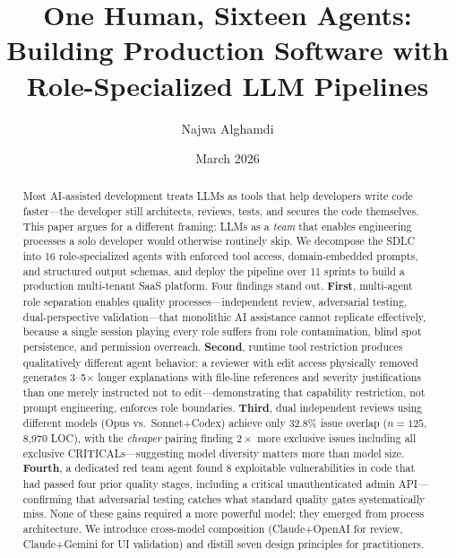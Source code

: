\documentclass[11pt,a4paper]{article}
\begin{document}
\title{One Human, Sixteen Agents:\\ Building Production Software with Role-Specialized LLM Pipelines}

\author[1]{Najwa Alghamdi}

\date{March 2026}

\maketitle

\begin{abstract}
Most AI-assisted development treats LLMs as tools that help developers write code faster---the developer still architects, reviews, tests, and secures the code themselves. This paper argues for a different framing: LLMs as a \textit{team} that enables engineering processes a solo developer would otherwise routinely skip. We decompose the SDLC into 16 role-specialized agents with enforced tool access, domain-embedded prompts, and structured output schemas, and deploy the pipeline over 11 sprints to build a production multi-tenant SaaS platform. Four findings stand out. \textbf{First}, multi-agent role separation enables quality processes---independent review, adversarial testing, dual-perspective validation---that monolithic AI assistance cannot replicate effectively, because a single session playing every role suffers from role contamination, blind spot persistence, and permission overreach. \textbf{Second}, runtime tool restriction produces qualitatively different agent behavior: a reviewer with edit access physically removed generates 3--5$\times$ longer explanations with file-line references and severity justifications than one merely instructed not to edit---demonstrating that capability restriction, not prompt engineering, enforces role boundaries. \textbf{Third}, dual independent reviews using different models (Opus vs.\ Sonnet+Codex) achieve only 32.8\% issue overlap ($n=125$, 8{,}970 LOC), with the \textit{cheaper} pairing finding $2\times$ more exclusive issues including all exclusive CRITICALs---suggesting model diversity matters more than model size. \textbf{Fourth}, a dedicated red team agent found 8 exploitable vulnerabilities in code that had passed four prior quality stages, including a critical unauthenticated admin API---confirming that adversarial testing catches what standard quality gates systematically miss. None of these gains required a more powerful model; they emerged from process architecture. We introduce cross-model composition (Claude+OpenAI for review, Claude+Gemini for UI validation) and distill seven design principles for practitioners.
\end{abstract}
\end{document}
